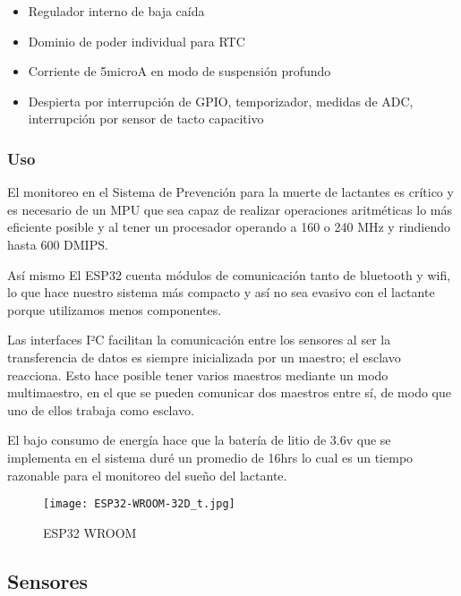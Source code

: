 \begin{itemize}
                \begin{itemize}
                    \item Regulador interno de baja caída
                    \item Dominio de poder individual para RTC
                    \item Corriente de 5microA en modo de suspensión profundo
                    \item Despierta por interrupción de GPIO, temporizador, medidas de ADC, interrupción por sensor de tacto capacitivo
                \end{itemize}
        \end{itemize}

    \subsubsection{Uso}
        El monitoreo en el Sistema de Prevención para la muerte de lactantes es crítico y es necesario de un MPU 
        que sea capaz de realizar operaciones aritméticas lo más eficiente posible y al tener un procesador operando 
        a 160 o 240 MHz y rindiendo hasta 600 DMIPS.

        Así mismo El ESP32 cuenta módulos de comunicación tanto de bluetooth y wifi, lo que hace nuestro sistema 
        más compacto y así no sea evasivo con el lactante porque utilizamos menos componentes.

        Las interfaces I²C facilitan la comunicación entre los sensores al ser la transferencia de datos es 
        siempre inicializada por un maestro; el esclavo reacciona. Esto hace posible tener varios maestros mediante 
        un modo multimaestro, en el que se pueden comunicar dos maestros entre sí, de modo que uno de ellos trabaja 
        como esclavo.

        El bajo consumo de energía hace que la batería de litio de 3.6v que se implementa en el sistema duré un
        promedio de 16hrs lo cual es un tiempo razonable para el monitoreo del sueño del lactante.

    \begin{figure}[htp!]
        \centering
        \texttt{[image: ESP32-WROOM-32D\_t.jpg]}
        \caption{ESP32 WROOM}
        \label{fig: esp32}
    \end{figure}
    \FloatBarrier

    \subsection{Sensores}    
